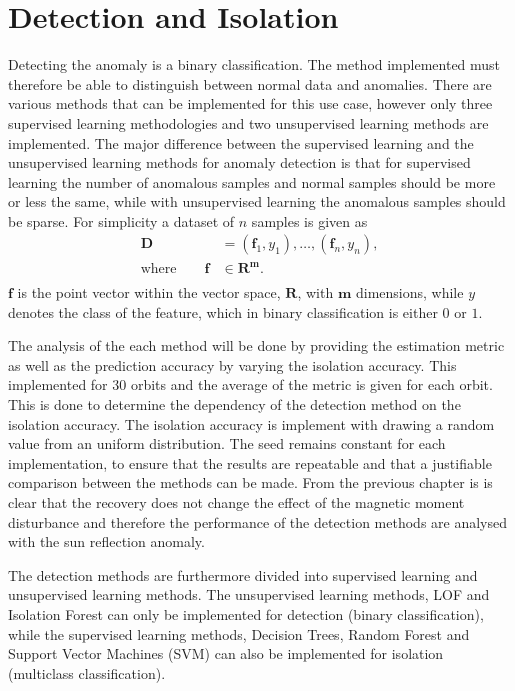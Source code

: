 \chapter{Detection and Isolation}
\label{chap:Detection}
Detecting the anomaly is a binary classification. The method implemented must therefore be able to distinguish between normal data and anomalies. There are various methods that can be implemented for this use case, however only three supervised learning methodologies and two unsupervised learning methods are implemented. The major difference between the supervised learning and the unsupervised learning methods for anomaly detection is that for supervised learning the number of anomalous samples and normal samples should be more or less the same, while with unsupervised learning the anomalous samples should be sparse. For simplicity a dataset of $n$ samples is given as 
\begin{equation}
\begin{aligned}
\mathbf{D} &= \left(\mathbf{f}_1, y_1 \right), \ldots , \left(\mathbf{f}_n, y_n \right), \\
\text{where} \qquad \mathbf{f} & \in \mathbf{R^m}. \\
\end{aligned}
\end{equation}
$\mathbf{f}$ is the point vector within the vector space, $\mathbf{R}$, with $\mathbf{m}$ dimensions, while $y$ denotes the class of the feature, which in binary classification is either $0$ or $1$.

The analysis of the each method will be done by providing the estimation metric as well as the prediction accuracy by varying the isolation accuracy. This implemented for $30$ orbits and the average of the metric is given for each orbit. This is done to determine the dependency of the detection method on the isolation accuracy. The isolation accuracy is implement with drawing a random value from an uniform distribution. The seed remains constant for each implementation, to ensure that the results are repeatable and that a justifiable comparison between the methods can be made. From the previous chapter is is clear that the recovery does not change the effect of the magnetic moment disturbance and therefore the performance of the detection methods are analysed with the sun reflection anomaly.

The detection methods are furthermore divided into supervised learning and unsupervised learning methods. The unsupervised learning methods, LOF and Isolation Forest can only be implemented for detection (binary classification), while the supervised learning methods, Decision Trees, Random Forest and Support Vector Machines (SVM) can also be implemented for isolation (multiclass classification).

